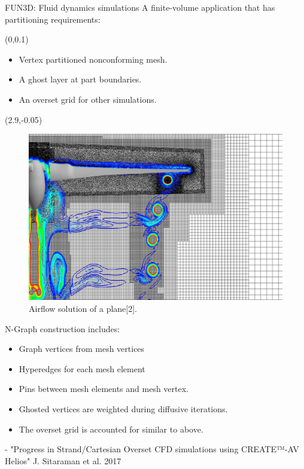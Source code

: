 \documentclass{beamer}
\begin{document}
\begin{textblock}{15.6}
\begin{textblock}{5.2}
    \begin{block}{\centering FUN3D: Fluid dynamics simulations}
      A finite-volume application that has partitioning requirements:
      \begin{textblock}{3.5}(0,0.1)
      \begin{itemize}
      \item Vertex partitioned nonconforming mesh.
      \item A ghost layer at part boundaries.
      \item An overset grid for other simulations.
      \end{itemize}
      \end{textblock}
      \begin{textblock}{2.5}(2.9,-0.05)
        \begin{figure}
          \centering
          \includegraphics[width=.8\textwidth]{../figures/FUN3D.jpg}
          \caption{Airflow solution of a plane[2].} 
        \end{figure}
      \end{textblock}
      \vspace{5.25cm}
      N-Graph construction includes:
      \begin{itemize}
      \item Graph vertices from mesh vertices
      \item Hyperedges for each mesh element
      \item Pins between mesh elements and mesh vertex.
      \item Ghosted vertices are weighted during diffusive iterations.
      \item The overset grid is accounted for similar to above.
      \end{itemize}
      
    \end{block}
    \vspace{-.7cm}
    {\fontsize{22}{23} - "Progress in Strand/Cartesian Overset CFD simulations using CREATE™-AV Helios" J. Sitaraman et al. 2017
    }


\end{textblock}
\end{textblock}
\end{document}
